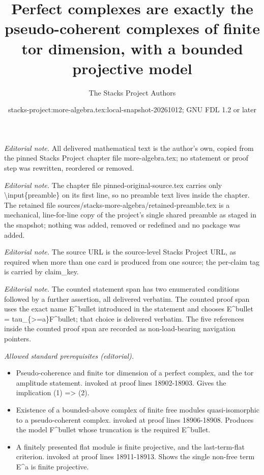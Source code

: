 \documentclass[10pt,a4paper]{amsart}
\title{Perfect complexes are exactly the pseudo-coherent complexes of finite tor dimension, with a bounded projective model}
\author{The Stacks Project Authors}
\date{stacks-project:more-algebra.tex:local-snapshot-20261012; GNU FDL 1.2 or later}
\theoremstyle{plain}
\theoremstyle{definition}
\theoremstyle{remark}
\numberwithin{equation}{subsection}
\begin{document}
\maketitle
\setcounter{subsection}{1}
\noindent\textit{Editorial note.} All delivered mathematical text is the author's own, copied from the pinned Stacks Project chapter file more-algebra.tex; no statement or proof step was rewritten, reordered or removed.\par\medskip
\noindent\textit{Editorial note.} The chapter file pinned-original-source.tex carries only \textbackslash{}input\{preamble\} on its first line, so no preamble text lives inside the chapter. The retained file sources/stacks-more-algebra/retained-preamble.tex is a mechanical, line-for-line copy of the project's single shared preamble as staged in the snapshot; nothing was added, removed or redefined and no package was added.\par\medskip
\noindent\textit{Editorial note.} The source URL is the source-level Stacks Project URL, as required when more than one card is produced from one source; the per-claim tag is carried by claim\_key.\par\medskip
\noindent\textit{Editorial note.} The counted statement span has two enumerated conditions followed by a further assertion, all delivered verbatim. The counted proof span uses the exact name E\textasciicircum{}bullet introduced in the statement and chooses E\textasciicircum{}bullet = tau\_\{>=a\}F\textasciicircum{}bullet; that choice is delivered verbatim. The five references inside the counted proof span are recorded as non-load-bearing navigation pointers.\par\medskip
\noindent\textit{Allowed standard prerequisites (editorial).}\begin{itemize}
\item Pseudo-coherence and finite tor dimension of a perfect complex, and the tor amplitude statement. invoked at proof lines 18902-18903. Gives the implication (1) => (2).
\item Existence of a bounded-above complex of finite free modules quasi-isomorphic to a pseudo-coherent complex. invoked at proof lines 18906-18908. Produces the model F\textasciicircum{}bullet whose truncation is the required E\textasciicircum{}bullet.
\item A finitely presented flat module is finite projective, and the last-term-flat criterion. invoked at proof lines 18911-18913. Shows the single non-free term E\textasciicircum{}a is finite projective.
\end{itemize}\medskip
\end{document}
